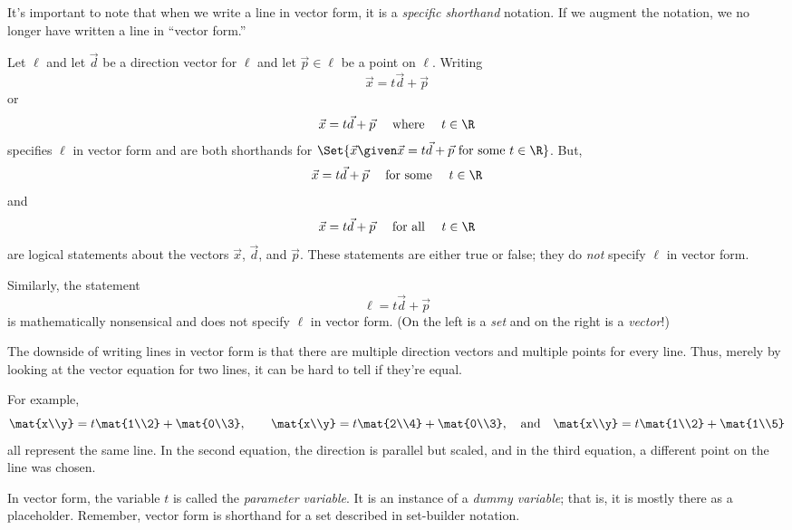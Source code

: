 It's important to note that when we write a line in vector form, it is a \emph{specific shorthand} notation.
If we augment the notation, we no longer have written a line in ``vector form.''

\begin{example} Let $\ell$ and let $\vec d$ be a direction vector for $\ell$ and let $\vec p\in \ell$
	be a point on $\ell$. Writing
	\[
		\vec x=t\vec d+\vec p
	\]
	or 
	\[
		\vec x=t\vec d+\vec p\quad\text{ where }\quad t\in \R
	\]
	specifies $\ell$ in vector form and are both shorthands for $\Set{\vec x\given
	\vec x=t\vec d+\vec p\text{ for some }t\in \R}$. But,
	\[
		\vec x=t\vec d+\vec p\quad\text{ for some }\quad t\in \R
	\]
	and
	\[
		\vec x=t\vec d+\vec p\quad\text{ for all }\quad t\in \R
	\]
	are logical statements about the vectors $\vec x$, $\vec d$, and
	$\vec p$. These statements are either true or false; they do \emph{not} 
	specify $\ell$ in vector form.

	Similarly, the statement
	\[
		\ell = t\vec d+\vec p
	\]
	is mathematically nonsensical and does not specify $\ell$ in vector form. (On the
	left is a \emph{set} and on the right is a \emph{vector}!)

\end{example}

The downside of writing lines in vector form is that there are multiple direction vectors and multiple points
for every line.  Thus, merely by looking at the vector equation for two lines, it can be hard to tell if
they're equal.

For example,
\[
	\mat{x\\y} = t\mat{1\\2}+\mat{0\\3},\qquad
	\mat{x\\y} = t\mat{2\\4}+\mat{0\\3},\quad\text{and}\quad
	\mat{x\\y} = t\mat{1\\2}+\mat{1\\5}
\]
all represent the same line.  In the second equation, the direction is parallel but scaled, and in
the third equation, a different point on the line was chosen.

In vector form, the variable $t$ is called the \emph{parameter variable}.  It is an instance of
a \emph{dummy variable}; that is, it is mostly there as a placeholder.  Remember, vector
form is shorthand for a set described in set-builder notation.

